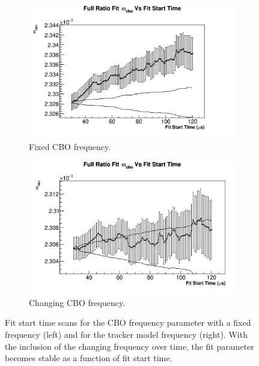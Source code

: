 		\begin{figure}[]
		\centering
		    \begin{subfigure}[t]{0.45\textwidth}
			    \centering
				\includegraphics[width=\textwidth]{fixed-wcbo-vs-fs}
			    \caption{Fixed CBO frequency.}
		    \end{subfigure}
		    \hspace{4mm}
		    \begin{subfigure}[t]{0.45\textwidth}
			    \centering
				\includegraphics[width=\textwidth]{RatioCBO_omega_cbo_FS_Canv}
			    \caption{Changing CBO frequency.}
		    \end{subfigure}
		\caption[CBOFreqModel]{Fit start time scans for the CBO frequency parameter with a fixed frequency (left) and for the tracker model frequency (right). With the inclusion of the changing frequency over time, the fit parameter becomes stable as a function of fit start time.}
		\label{fig:CBOFreqModel}
		\end{figure}


